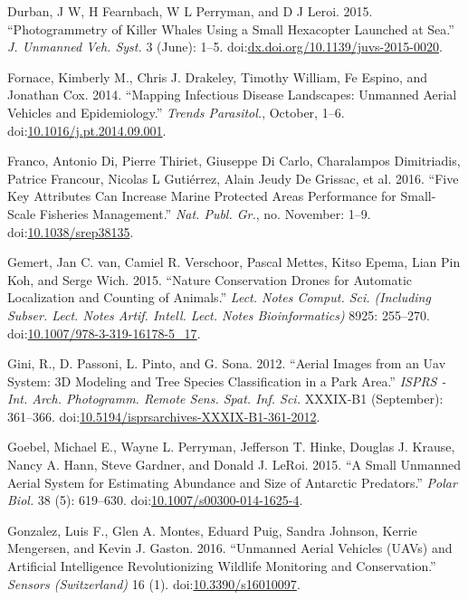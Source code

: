 \documentclass[]{interact}
\theoremstyle{plain}%
\theoremstyle{definition}
\theoremstyle{remark}
\begin{document}
\hypertarget{ref-durban_photogrammetry_2015}{}
Durban, J W, H Fearnbach, W L Perryman, and D J Leroi. 2015.
``Photogrammetry of Killer Whales Using a Small Hexacopter Launched at
Sea.'' \emph{J. Unmanned Veh. Syst.} 3 (June): 1--5.
doi:\href{https://doi.org/dx.doi.org/10.1139/juvs-2015-0020}{dx.doi.org/10.1139/juvs-2015-0020}.

\hypertarget{ref-fornace_mapping_2014}{}
Fornace, Kimberly M., Chris J. Drakeley, Timothy William, Fe Espino, and
Jonathan Cox. 2014. ``Mapping Infectious Disease Landscapes: Unmanned
Aerial Vehicles and Epidemiology.'' \emph{Trends Parasitol.}, October,
1--6.
doi:\href{https://doi.org/10.1016/j.pt.2014.09.001}{10.1016/j.pt.2014.09.001}.

\hypertarget{ref-franco_five_2016}{}
Franco, Antonio Di, Pierre Thiriet, Giuseppe Di Carlo, Charalampos
Dimitriadis, Patrice Francour, Nicolas L Gutiérrez, Alain Jeudy De
Grissac, et al. 2016. ``Five Key Attributes Can Increase Marine
Protected Areas Performance for Small-Scale Fisheries Management.''
\emph{Nat. Publ. Gr.}, no. November: 1--9.
doi:\href{https://doi.org/10.1038/srep38135}{10.1038/srep38135}.

\hypertarget{ref-van_gemert_nature_2015}{}
Gemert, Jan C. van, Camiel R. Verschoor, Pascal Mettes, Kitso Epema,
Lian Pin Koh, and Serge Wich. 2015. ``Nature Conservation Drones for
Automatic Localization and Counting of Animals.'' \emph{Lect. Notes
Comput. Sci. (Including Subser. Lect. Notes Artif. Intell. Lect. Notes
Bioinformatics)} 8925: 255--270.
doi:\href{https://doi.org/10.1007/978-3-319-16178-5_17}{10.1007/978-3-319-16178-5\_17}.

\hypertarget{ref-gini_aerial_2012}{}
Gini, R., D. Passoni, L. Pinto, and G. Sona. 2012. ``Aerial Images from
an Uav System: 3D Modeling and Tree Species Classification in a Park
Area.'' \emph{ISPRS - Int. Arch. Photogramm. Remote Sens. Spat. Inf.
Sci.} XXXIX-B1 (September): 361--366.
doi:\href{https://doi.org/10.5194/isprsarchives-XXXIX-B1-361-2012}{10.5194/isprsarchives-XXXIX-B1-361-2012}.

\hypertarget{ref-goebel_small_2015}{}
Goebel, Michael E., Wayne L. Perryman, Jefferson T. Hinke, Douglas J.
Krause, Nancy A. Hann, Steve Gardner, and Donald J. LeRoi. 2015. ``A
Small Unmanned Aerial System for Estimating Abundance and Size of
Antarctic Predators.'' \emph{Polar Biol.} 38 (5): 619--630.
doi:\href{https://doi.org/10.1007/s00300-014-1625-4}{10.1007/s00300-014-1625-4}.

\hypertarget{ref-gonzalez_unmanned_2016}{}
Gonzalez, Luis F., Glen A. Montes, Eduard Puig, Sandra Johnson, Kerrie
Mengersen, and Kevin J. Gaston. 2016. ``Unmanned Aerial Vehicles (UAVs)
and Artificial Intelligence Revolutionizing Wildlife Monitoring and
Conservation.'' \emph{Sensors (Switzerland)} 16 (1).
doi:\href{https://doi.org/10.3390/s16010097}{10.3390/s16010097}.
\end{document}
